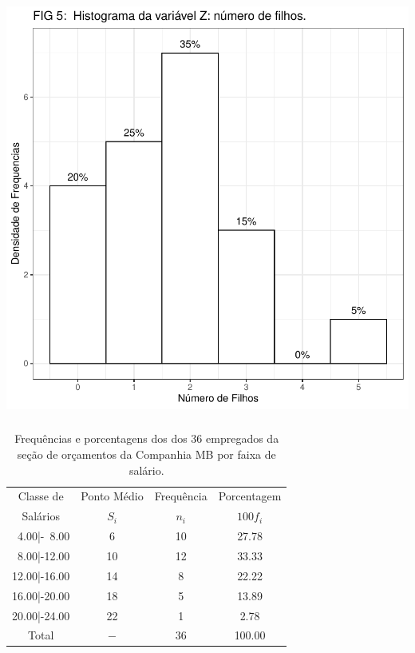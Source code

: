 \documentclass[14pt,aspectratio=1610]{beamer}
\begin{document}
\begin{frame}{}
\frametitle{}
\begin{block}{}
\begin{center}
\includegraphics{Aula5-hist2}
\end{center}
\end{block}
\end{frame}

\begin{frame}{}
\frametitle{}
\begin{block}{}
\justifying
\begin{table}[H]
\caption{Frequências e porcentagens dos dos 36 empregados da seção de orçamentos da Companhia MB por faixa de salário.}
\label{tab4}
\begin{tabular}{c|c|c|c}
\hline
Classe de   &Ponto Médio&Frequência&Porcentagem\\
Salários    &    $S_{i}$& $n_{i}$  &$100f_{i}$ \\
\hline
~4.00|-~8.00&  6        &10        &27.78      \\
~8.00|-12.00& 10        &12        &33.33      \\
12.00|-16.00& 14        &8         &22.22      \\
16.00|-20.00& 18        &5         &13.89      \\
20.00|-24.00& 22        &1         & 2.78      \\
\hline
Total       &   $-$     &36        &100.00     \\
\hline
\end{tabular}
\end{table}
\end{block}
\end{frame}
\end{document}
